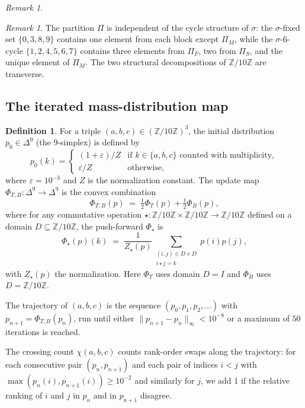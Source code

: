 \documentclass[submission,copyright,creativecommons]{eptcs}
\theoremstyle{plain}
\theoremstyle{definition}
\newtheorem{definition}[theorem]{Definition}
\theoremstyle{remark}
\newtheorem{remark}[theorem]{Remark}
\begin{document}
\begin{remark}
\begin{remark}
The partition $\Pi$ is independent of the cycle structure of $\sigma$: the
$\sigma$-fixed set $\{0, 3, 8, 9\}$ contains one element from each block
except $\Pi_M$, while the $\sigma$-$6$-cycle $\{1, 2, 4, 5, 6, 7\}$
contains three elements from $\Pi_F$, two from $\Pi_S$, and the unique
element of $\Pi_M$. The two structural decompositions of
$\mathbb{Z}/10\mathbb{Z}$ are transverse.
\end{remark}

\subsection{The iterated mass-distribution map}

\begin{definition}\label{def:processor}
For a triple $(a, b, c) \in (\mathbb{Z}/10\mathbb{Z})^3$, the initial
distribution $p_0 \in \Delta^9$ (the $9$-simplex) is defined by
\[
p_0(k) = \begin{cases}
(1 + \varepsilon)/Z & \text{if } k \in \{a, b, c\} \text{ counted with multiplicity},\\
\varepsilon/Z & \text{otherwise},
\end{cases}
\]
where $\varepsilon = 10^{-3}$ and $Z$ is the normalization constant. The
update map $\Phi_{T, B} : \Delta^9 \to \Delta^9$ is the convex combination
\[
\Phi_{T, B}(p) \;=\; \tfrac{1}{2} \Phi_T(p) + \tfrac{1}{2} \Phi_B(p),
\]
where for any commutative operation $\star : \mathbb{Z}/10\mathbb{Z} \times
\mathbb{Z}/10\mathbb{Z} \to \mathbb{Z}/10\mathbb{Z}$ defined on a domain
$D \subseteq \mathbb{Z}/10\mathbb{Z}$, the push-forward $\Phi_\star$ is
\[
\Phi_\star(p)(k) \;=\; \frac{1}{Z_\star(p)} \sum_{\substack{(i, j) \in D \times D \\ i \star j = k}}
p(i) p(j),
\]
with $Z_\star(p)$ the normalization. Here $\Phi_T$ uses domain $D = I$ and
$\Phi_B$ uses $D = \mathbb{Z}/10\mathbb{Z}$.

The trajectory of $(a, b, c)$ is the sequence
$(p_0, p_1, p_2, \dots)$ with $p_{n+1} = \Phi_{T, B}(p_n)$, run until either
$\|p_{n+1} - p_n\|_\infty < 10^{-8}$ or a maximum of $50$ iterations is
reached.

The crossing count $\chi(a, b, c)$ counts rank-order swaps along the
trajectory: for each consecutive pair $(p_n, p_{n+1})$ and each pair of
indices $i < j$ with $\max(p_n(i), p_{n+1}(i)) \geq 10^{-2}$ and similarly
for $j$, we add $1$ if the relative ranking of $i$ and $j$ in $p_n$ and in
$p_{n+1}$ disagree.
\end{definition}


\end{remark}
\end{document}
